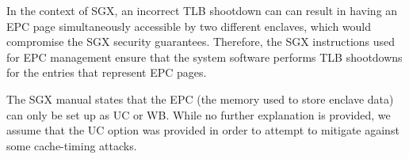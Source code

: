 In the context of SGX, an incorrect TLB shootdown can can result in having an
EPC page simultaneously accessible by two different enclaves, which would
compromise the SGX security guarantees. Therefore, the SGX instructions used
for EPC management ensure that the system software performs TLB shootdowns for
the entries that represent EPC pages.


The SGX manual states that the EPC (the memory used to store enclave data) can
only be set up as UC or WB. While no further explanation is provided, we assume
that the UC option was provided in order to attempt to mitigate against some
cache-timing attacks.

